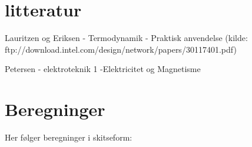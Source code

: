 \section{litteratur}
\vspace{1cm}
Lauritzen og Eriksen - Termodynamik - Praktisk anvendelse
(kilde: ftp://download.intel.com/design/network/papers/30117401.pdf)

Petersen - elektroteknik 1 -Elektricitet og Magnetisme 


\section{Beregninger}

Her følger beregninger i skitseform: 

